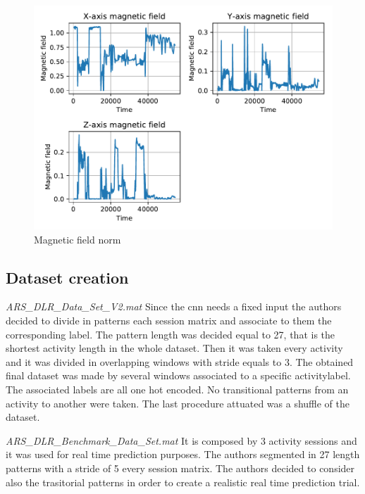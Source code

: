 \begin{figure}[htp]
\includegraphics[scale=0.55]{magnetic_field_susanna.pdf}
\caption{Magnetic field norm}
\label{fig:mag}
\end{figure}


\subsection{Dataset creation}

\begin{LaTeXdescription}
	\item[\textit{ARS\_DLR\_Data\_Set\_V2.mat}]
		Since the \gls{cnn} needs a fixed input the authors decided to divide in patterns each session matrix and associate to them the corresponding label. The pattern length was decided equal to 27, that is the shortest activity length in the whole dataset. 
		Then it was taken every activity and it was divided in overlapping windows with stride equals to 3. The obtained final dataset was made by several windows associated to a specific activitylabel. The associated labels are all one hot encoded. No transitional patterns from an activity to another were taken. The last procedure attuated was a shuffle of the dataset.

	\item[\textit{ARS\_DLR\_Benchmark\_Data\_Set.mat}]
		It is composed by 3 activity sessions and it was used for real time prediction purposes. The authors segmented in 27 length patterns with a stride of 5 every session matrix. The authors decided to consider also the trasitorial patterns in order to create a realistic real time prediction trial.
\end{LaTeXdescription}


